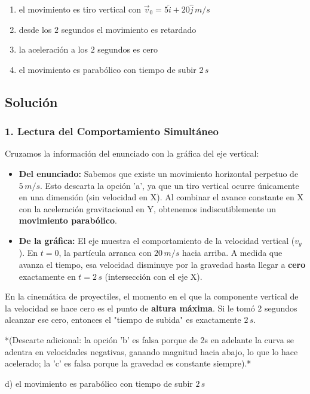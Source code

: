 \documentclass[12pt, a4paper]{article}
\begin{document}
\begin{enumerate}[label=\alph*)]
    \item el movimiento es tiro vertical con $\vec{v}_0 = 5\hat{i} + 20\hat{j} \,\si{m/s}$
    \item desde los $2$ segundos el movimiento es retardado
    \item la aceleración a los $2$ segundos es cero
    \item el movimiento es parabólico con tiempo de subir $2\,\si{s}$
\end{enumerate}

\subsection*{Solución}

\subsubsection*{1. Lectura del Comportamiento Simultáneo}
Cruzamos la información del enunciado con la gráfica del eje vertical:
\begin{itemize}
    \item \textbf{Del enunciado:} Sabemos que existe un movimiento horizontal perpetuo de $5\,\si{m/s}$. Esto descarta la opción 'a', ya que un tiro vertical ocurre únicamente en una dimensión (sin velocidad en X). Al combinar el avance constante en X con la aceleración gravitacional en Y, obtenemos indiscutiblemente un \textbf{movimiento parabólico}.
    \item \textbf{De la gráfica:} El eje muestra el comportamiento de la velocidad vertical ($v_y$). En $t=0$, la partícula arranca con $20\,\si{m/s}$ hacia arriba. A medida que avanza el tiempo, esa velocidad disminuye por la gravedad hasta llegar a \textbf{cero} exactamente en $t = 2\,\si{s}$ (intersección con el eje X).
\end{itemize}
En la cinemática de proyectiles, el momento en el que la componente vertical de la velocidad se hace cero es el punto de \textbf{altura máxima}. Si le tomó 2 segundos alcanzar ese cero, entonces el "tiempo de subida" es exactamente $2\,\si{s}$.

*(Descarte adicional: la opción 'b' es falsa porque de 2s en adelante la curva se adentra en velocidades negativas, ganando magnitud hacia abajo, lo que lo hace acelerado; la 'c' es falsa porque la gravedad es constante siempre).*

\begin{tcolorbox}[colback=green!5!white, colframe=green!50!black, title=Respuesta Final]
\centering \Large d) el movimiento es parabólico con tiempo de subir $2\,\si{s}$
\end{tcolorbox}
\end{document}
